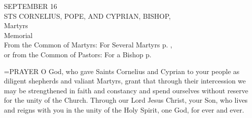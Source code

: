 \begin{center}\normalsize SEPTEMBER 16\\
\footnotesize STS CORNELIUS, POPE, AND CYPRIAN, BISHOP, \\
\footnotesize Martyrs\\
\footnotesize Memorial\\
\footnotesize From the Common of Martyrs: For Several Martyrs p.   , \\
\footnotesize or from the Common of Pastors: For a Bishop p.   \\
\end{center}

\hangindent=\parindent \small{PRAYER 
O God, who gave Saints Cornelius and Cyprian to your people
as diligent shepherds and valiant Martyrs,
grant that through their intercession
we may be strengthened in faith and constancy
and spend ourselves without reserve
for the unity of the Church.
Through our Lord Jesus Christ, your Son,
who lives and reigns with you in the unity of the Holy Spirit,
one God, for ever and ever.\\}
 

